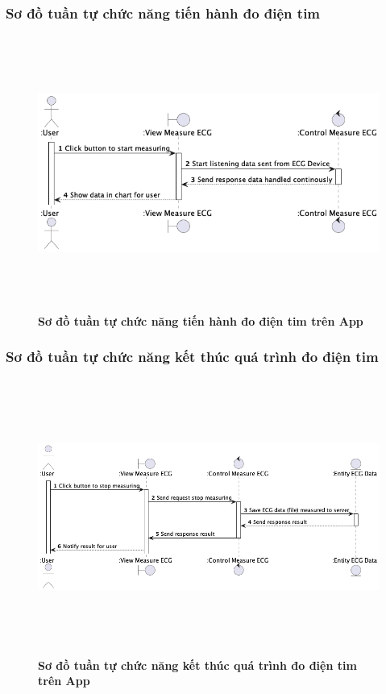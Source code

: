 \documentclass{article}%
\begin{document}
\subsubsection{Sơ đồ tuần tự chức năng tiến hành đo điện tim}
  \begin{figure}[H]
        \centering
        \includegraphics[width=16cm,height=9cm]{Images/mobile_app/start_measuring_ecg.png}
        \caption[Sơ đồ tuần tự chức năng tiến hành đo điện tim trên App]{\bfseries \fontsize{12pt}{0pt}
        \selectfont Sơ đồ tuần tự chức năng tiến hành đo điện tim trên App}
        \label{hinh21} %
  \end{figure}
 
\subsubsection{Sơ đồ tuần tự chức năng kết thúc quá trình đo điện tim}
  \begin{figure}[H]
        \centering
        \includegraphics[width=16cm,height=9cm]{Images/mobile_app/end_measuring_ecg.png}
        \caption[Sơ đồ tuần tự chức năng kết thúc quá trình đo điện tim trên App]{\bfseries \fontsize{12pt}{0pt}
        \selectfont Sơ đồ tuần tự chức năng kết thúc quá trình đo điện tim trên App}
        \label{hinh21} %
  \end{figure}
\end{document}
